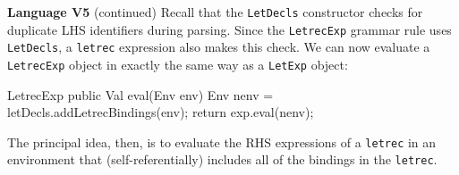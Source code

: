 \begin{minipage}[t]{\sw}
\slidenumber
\LARGE
{\bf Language V5} (continued)\exx
{\Large
\emm{}}\exx
Recall that the \verb'LetDecls' constructor checks
for duplicate LHS identifiers during parsing.
Since the \verb'LetrecExp' grammar rule uses \verb'LetDecls',
a \verb'letrec' expression also makes this check.\exx
We can now evaluate a \verb'LetrecExp' object
in exactly the same way as a \verb'LetExp' object:
{\Large
\begin{qv}
LetrecExp
    public Val eval(Env env) {
        Env nenv = letDecls.addLetrecBindings(env);
        return exp.eval(nenv);
    }
\end{qv}
}
The principal idea, then,
is to evaluate the RHS expressions of a \verb'letrec'
in an environment that (self-referentially) includes all of the bindings
in the \verb'letrec'.
\end{minipage}
\clearpage
